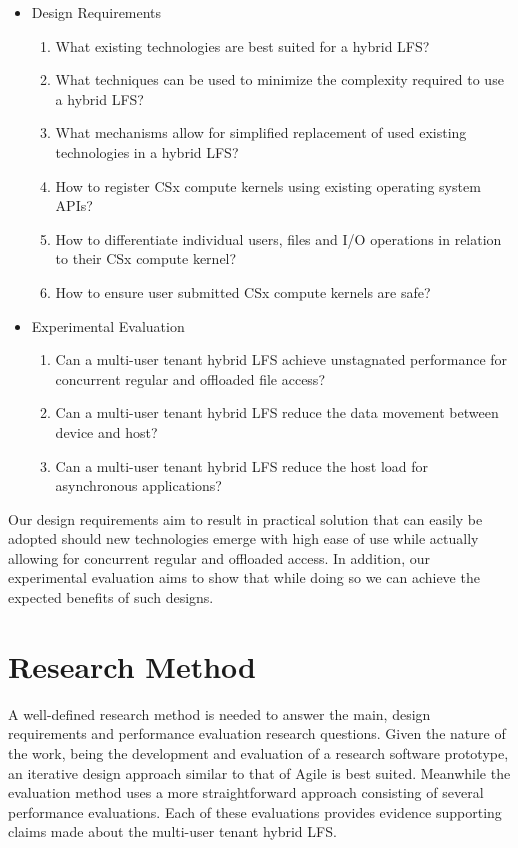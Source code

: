 \begin{itemize}
    \item Design Requirements
    \begin{enumerate}
        \item What existing technologies are best suited for a hybrid LFS?
        \item What techniques can be used to minimize the complexity required to
              use a hybrid LFS?
        \item What mechanisms allow for simplified replacement of used existing
              technologies in a hybrid LFS?
        \item How to register CSx compute kernels using existing operating 
              system APIs?
        \item How to differentiate individual users, files and I/O operations in
              relation to their CSx compute kernel?
        \item How to ensure user submitted CSx compute kernels are safe?
    \end{enumerate}
    \item Experimental Evaluation
    \begin{enumerate}
        \item Can a multi-user tenant hybrid LFS achieve unstagnated performance
              for concurrent regular and offloaded file access?
        \item Can a multi-user tenant hybrid LFS reduce the data movement
              between device and host?
        \item Can a multi-user tenant hybrid LFS reduce the host load for
              asynchronous applications?
    \end{enumerate}
\end{itemize}

Our design requirements aim to result in practical solution that can easily be
adopted should new technologies emerge with high ease of use while actually
allowing for concurrent regular and offloaded access. In addition, our
experimental evaluation aims to show that while doing so we can achieve the
expected benefits of such designs.

\section{Research Method}

A well-defined research method is needed to answer the main, design requirements
and performance evaluation research questions. Given the nature of the work,
being the development and evaluation of a research software prototype, an
iterative design approach similar to that of Agile is best suited. Meanwhile the
evaluation method uses a more straightforward approach consisting of several
performance evaluations. Each of these evaluations provides evidence supporting
claims made about the multi-user tenant hybrid LFS.

